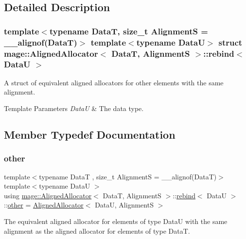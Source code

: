 \subsection{Detailed Description}
\subsubsection*{template$<$typename DataT, size\+\_\+t AlignmentS = \+\_\+\+\_\+alignof(\+Data\+T)$>$\newline
template$<$typename DataU$>$\newline
struct mage\+::\+Aligned\+Allocator$<$ Data\+T, Alignment\+S $>$\+::rebind$<$ Data\+U $>$}

A struct of equivalent aligned allocators for other elements with the same alignment.


\begin{DoxyTemplParams}{Template Parameters}
{\em DataU} & The data type. \\
\hline
\end{DoxyTemplParams}


\subsection{Member Typedef Documentation}
\hypertarget{structmage_1_1_aligned_allocator_1_1rebind_aeb2e9c9add001b8f603f5b67ad8fee56}{}\label{structmage_1_1_aligned_allocator_1_1rebind_aeb2e9c9add001b8f603f5b67ad8fee56} 
\subsubsection{\texorpdfstring{other}{other}}
{\footnotesize\ttfamily template$<$typename DataT , size\+\_\+t AlignmentS = \+\_\+\+\_\+alignof(\+Data\+T)$>$ \\
template$<$typename DataU $>$ \\
using \hyperlink{structmage_1_1_aligned_allocator}{mage\+::\+Aligned\+Allocator}$<$ DataT, AlignmentS $>$\+::\hyperlink{structmage_1_1_aligned_allocator_1_1rebind}{rebind}$<$ DataU $>$\+::\hyperlink{structmage_1_1_aligned_allocator_1_1rebind_aeb2e9c9add001b8f603f5b67ad8fee56}{other} =  \hyperlink{structmage_1_1_aligned_allocator}{Aligned\+Allocator}$<$ DataU, AlignmentS $>$}

The equivalent aligned allocator for elements of type {\ttfamily DataU} with the same alignment as the aligned allocator for elements of type {\ttfamily DataT}. 

